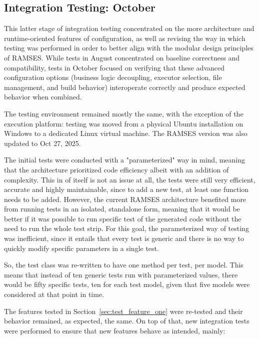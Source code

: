 \subsection{Integration Testing: October}
\label{sec:test_feature_two}

This latter stage of integration testing concentrated on the more architecture and runtime-oriented features of configuration, as well as revising the way in which testing was performed in order to better align with the modular design principles of \gls{RAMSES}. While tests in August concentrated on baseline correctness and compatibility, tests in October focused on verifying that these advanced configuration options (business logic decoupling, executor selection, file management, and build behavior) interoperate correctly and produce expected behavior when combined.

The testing environment remained mostly the same, with the exception of the execution platform: testing was moved from a physical Ubuntu installation on Windows to a dedicated Linux virtual machine. The \gls{RAMSES} version was also updated to Oct 27, 2025.

The initial tests were conducted with a "parameterized" way in mind, meaning that the architecture prioritized code efficiency albeit with an addition of complexity. This in of itself is not an issue at all, the tests were still very efficient, accurate and highly maintainable, since to add a new test, at least one function needs to be added. However, the current \gls{RAMSES} architecture benefited more from running tests in an isolated, standalone form, meaning that it would be better if it was possible to run specific test of the generated code without the need to run the whole test strip. For this goal, the parameterized way of testing was inefficient, since it entails that every test is generic and there is no way to quickly modify specific parameters in a single test.

So, the test class was re-written to have one method per test, per model. This means that instead of ten generic tests run with parameterized values, there would be fifty specific tests, ten for each test model, given that five models were considered at that point in time.

The features tested in Section~\ref{sec:test_feature_one} were re-tested and their behavior remained, as expected, the same. On top of that, new integration tests were performed to ensure that new features behave as intended, mainly:

